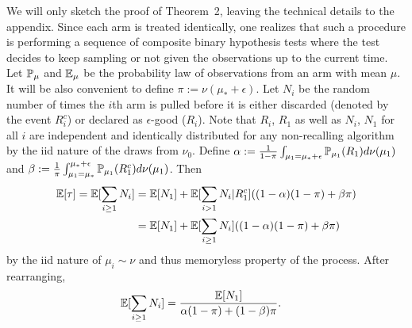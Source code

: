 We will only sketch the proof of Theorem~2, leaving the technical details to the appendix.
Since each arm is treated identically, one realizes that such a procedure is performing a sequence of composite binary hypothesis tests where the test decides to keep sampling or not given the observations up to the current time.
Let $\P_\mu$ and $\E_\mu$ be the probability law of observations from an arm with mean $\mu$.
It will be also convenient to define $\pi:=\nu(\mu_*+\epsilon)$.
Let $N_i$ be the random number of times the $i$th arm is pulled before it is either discarded (denoted by the event $R_i^c$) or declared as $\epsilon$-good ($R_i$). 
Note that $R_i$, $R_1$ as well as $N_i$, $N_1$ for all $i$ are independent and identically distributed for any non-recalling algorithm by the iid nature of the draws from $\nu_0$.
Define $\alpha := \frac{1}{1-\pi} \int_{\mu_1 = \mu_* + \epsilon} \P_{\mu_1}(R_1) d\nu(\mu_1)$ and $\beta := \frac{1}{\pi} \int_{\mu_1 = \mu_*}^{\mu_* + \epsilon} \P_{\mu_1}(R_1^c) d\nu(\mu_1)$.
Then
\begin{align*}
\E[\tau] = \E[ \sum_{i \geq 1} N_i ]
 &= \E[N_1] + \E[\sum_{i > 1} N_i | R_1^c] ( (1-\alpha) (1-\pi) + \beta \pi) \\
&= \E[N_1] + \E[\sum_{i \geq 1} N_i ] ( (1-\alpha) (1-\pi) + \beta \pi) 
\end{align*}
by the iid nature of $\mu_i \sim \nu$ and thus memoryless property of the process.
After rearranging,
\begin{align}
\E[ \sum_{i \geq 1} N_i ] &= \frac{\E[N_1]}{\alpha (1-\pi) + (1-\beta) \pi}. \label{eqn:N1_to_many}
\end{align}

